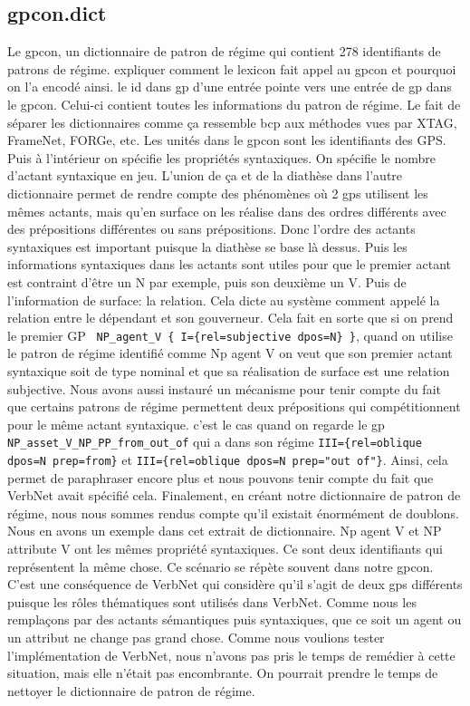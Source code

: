 \subsection{gpcon.dict}
Le gpcon, un dictionnaire de patron de régime qui contient 278 identifiants de patrons de régime.
expliquer comment le lexicon fait appel au gpcon et pourquoi on l'a encodé ainsi. le id dans gp d'une entrée pointe vers une entrée de gp dans le gpcon. Celui-ci contient toutes les informations du patron de régime. Le fait de séparer les dictionnaires comme ça ressemble bcp aux méthodes vues par XTAG, FrameNet, FORGe,  etc. Les unités dans le gpcon sont les identifiants des GPS. Puis à l'intérieur on spécifie les propriétés syntaxiques. On spécifie le nombre d'actant syntaxique en jeu. L'union de ça et de la diathèse dans l'autre dictionnaire permet de rendre compte des phénomènes où 2 gps utilisent les mêmes actants, mais qu'en surface on les réalise dans des ordres différents avec des prépositions différentes ou sans prépositions. Donc l'ordre des actants syntaxiques est important puisque la diathèse se base là dessus. Puis les informations syntaxiques dans les actants sont utiles pour que le premier actant est contraint d'être un N par exemple, puis son deuxième un V. Puis de l'information de surface: la relation. Cela dicte au système comment appelé la relation entre le dépendant et son gouverneur. Cela fait en sorte que si on prend le premier GP \lstinline! NP_agent_V { I={rel=subjective dpos=N} }!, quand on utilise le patron de régime identifié comme Np agent V on veut que son premier actant syntaxique soit de type nominal et que sa réalisation de surface est une relation subjective. Nous avons aussi instauré un mécanisme pour tenir compte du fait que certains patrons de régime permettent deux prépositions qui compétitionnent pour le même actant syntaxique. c'est le cas quand on regarde le gp \lstinline!NP_asset_V_NP_PP_from_out_of! qui a dans son régime \lstinline!III={rel=oblique dpos=N prep=from}! et \lstinline!III={rel=oblique dpos=N prep="out of"}!. Ainsi, cela permet de paraphraser encore plus et nous pouvons tenir compte du fait que VerbNet avait spécifié cela. Finalement, en créant notre dictionnaire de patron de régime, nous nous sommes rendus compte qu'il existait énormément de doublons. Nous en avons un exemple dans cet extrait de dictionnaire. Np agent V et NP attribute V ont les mêmes propriété syntaxiques. Ce sont deux identifiants qui représentent la même chose. Ce scénario se répète souvent dans notre gpcon. C'est une conséquence de VerbNet qui considère qu'il s'agit de deux gps différents puisque les rôles thématiques sont utilisés dans VerbNet. Comme nous les remplaçons par des actants sémantiques puis syntaxiques, que ce soit un agent ou un attribut ne change pas grand chose. Comme nous voulions tester l'implémentation de VerbNet, nous n'avons pas pris le temps de remédier à cette situation, mais elle n'était pas encombrante. On pourrait prendre le temps de nettoyer le dictionnaire de patron de régime.

